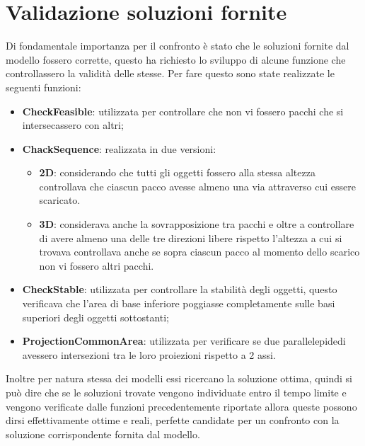 \section{Validazione soluzioni fornite}
Di fondamentale importanza per il confronto è stato che le soluzioni fornite dal modello fossero corrette, questo ha richiesto lo sviluppo di alcune funzione che controllassero la validità delle stesse. Per fare questo sono state realizzate le seguenti funzioni:
\begin{itemize}
	\item \textbf{CheckFeasible}: utilizzata per controllare che non vi fossero pacchi che si intersecassero con altri;
	\item \textbf{ChackSequence}: realizzata in due versioni:
	      \begin{itemize}
	      	\item \textbf{2D}: considerando che tutti gli oggetti fossero alla stessa altezza controllava che ciascun pacco avesse almeno una via attraverso cui essere scaricato.
	      	\item \textbf{3D}: considerava anche la sovrapposizione tra pacchi e oltre a controllare di avere almeno una delle tre direzioni libere rispetto l'altezza a cui si trovava controllava anche se sopra ciascun pacco al momento dello scarico non vi fossero altri pacchi.
	      \end{itemize}
	\item \textbf{CheckStable}: utilizzata per controllare la stabilità degli oggetti, questo verificava che l'area di base inferiore poggiasse completamente sulle basi superiori degli oggetti sottostanti;
	\item \textbf{ProjectionCommonArea}: utilizzata per verificare se due parallelepidedi avessero intersezioni tra le loro proiezioni rispetto a 2 assi.
\end{itemize}

Inoltre per natura stessa dei modelli essi ricercano la soluzione ottima, quindi si può dire che se le soluzioni trovate vengono individuate entro il tempo limite e vengono verificate dalle funzioni precedentemente riportate allora queste possono dirsi effettivamente ottime e reali, perfette candidate per un confronto con la soluzione corrispondente fornita dal modello.